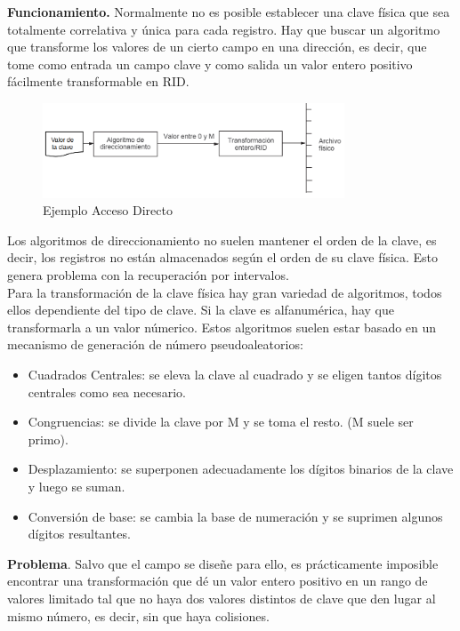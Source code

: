 \documentclass[a4paper,11pt]{article}
\begin{document}
\textbf{Funcionamiento.} Normalmente no es posible establecer una clave física que sea totalmente correlativa y única para cada registro. Hay que buscar un algoritmo que transforme los valores de un cierto campo en una dirección, es decir, que tome como entrada un campo clave y como salida un valor entero positivo fácilmente transformable en RID. 

\begin{figure}[h]
\centering
\caption{Ejemplo Acceso Directo}
\includegraphics[scale=1,width=0.8\textwidth]{acceso_directo.png}
\end{figure}

Los algoritmos de direccionamiento no suelen mantener el orden de la clave, es decir, los registros no están almacenados según el orden de su clave física. Esto genera problema con la recuperación por intervalos. \\

Para la transformación de la clave física hay gran variedad de algoritmos, todos ellos dependiente del tipo de clave. Si la clave es alfanumérica, hay que transformarla a un valor númerico. Estos algoritmos suelen estar basado en un mecanismo de generación de número pseudoaleatorios:

\begin{itemize}
\item Cuadrados Centrales: se eleva la clave al cuadrado y se eligen tantos dígitos centrales como sea necesario.

\item Congruencias: se divide la clave por M y se toma el resto. (M suele ser primo).

\item Desplazamiento: se superponen adecuadamente los dígitos binarios de la clave y luego se suman.

\item Conversión de base: se cambia la base de numeración y se suprimen algunos dígitos resultantes.
\end{itemize}

\textbf{Problema}. Salvo que el campo se diseñe para ello, es prácticamente imposible encontrar una transformación que dé un valor entero positivo en un rango de valores limitado tal que no haya dos valores distintos de clave que den lugar al mismo número, es decir, sin que haya colisiones. \\
\end{document}
